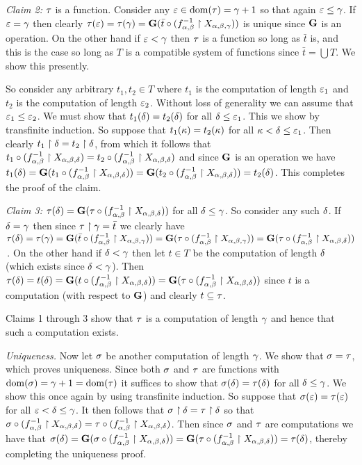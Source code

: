 {{    \emph{Claim 2:} $\tau$ is a function.
    Consider any $\varepsilon \in \mathrm{dom}(\tau) = \gamma+1$ so that again $\varepsilon \leq \gamma$.
    If $\varepsilon = \gamma$ then clearly $\tau(\varepsilon) = \tau(\gamma) = \mathbf{G}(\bar{t} \circ (f_{\alpha,\beta}^{-1} \restriction X_{\alpha,\beta,\gamma}))$ is unique since $\mathbf{G}$ is an operation.
    On the other hand if $\varepsilon < \gamma$ then $\tau$ is a function so long as $\bar{t}$ is, and this is the case so long as $T$ is a compatible system of functions since $\bar{t} = \bigcup T$.
    We show this presently.

    So consider any arbitrary $t_1, t_2 \in T$ where $t_1$ is the computation of length $\varepsilon_1$ and $t_2$ is the computation of length $\varepsilon_2$.
    Without loss of generality we can assume that $\varepsilon_1 \leq \varepsilon_2$.
    We must show that $t_1(\delta) = t_2(\delta)$ for all $\delta \leq \varepsilon_1$.
    This we show by transfinite induction.
    So suppose that $t_1(\kappa) = t_2(\kappa)$ for all $\kappa < \delta \leq \varepsilon_1$.
    Then clearly $t_1 \restriction \delta = t_2 \restriction \delta$, from which it follows that $t_1 \circ (f_{\alpha,\beta}^{-1} \restriction X_{\alpha,\beta,\delta}) = t_2 \circ (f_{\alpha,\beta}^{-1} \restriction X_{\alpha,\beta,\delta})$ and since $\mathbf{G}$ is an operation we have $t_1(\delta) = \mathbf{G}(t_1 \circ (f_{\alpha,\beta}^{-1} \restriction X_{\alpha,\beta,\delta})) = \mathbf{G}(t_2 \circ (f_{\alpha,\beta}^{-1} \restriction X_{\alpha,\beta,\delta})) = t_2(\delta)$.
    This completes the proof of the claim.

    \emph{Claim 3:} $\tau(\delta) = \mathbf{G}(\tau \circ (f_{\alpha,\beta}^{-1} \restriction X_{\alpha,\beta,\delta}))$ for all $\delta \leq \gamma$.
    So consider any such $\delta$.
    If $\delta = \gamma$ then since $\tau \restriction \gamma = \bar{t}$ we clearly have $\tau(\delta) = \tau(\gamma) = \mathbf{G}(\bar{t} \circ (f_{\alpha,\beta}^{-1} \restriction X_{\alpha,\beta,\gamma})) = \mathbf{G}(\tau \circ (f_{\alpha,\beta}^{-1} \restriction X_{\alpha,\beta,\gamma})) = \mathbf{G}(\tau \circ (f_{\alpha,\beta}^{-1} \restriction X_{\alpha,\beta,\delta}))$\,.
    On the other hand if $\delta < \gamma$ then let $t \in T$ be the computation of length $\delta$ (which exists since $\delta < \gamma$).
    Then $\tau(\delta) = t(\delta) = \mathbf{G}(t \circ (f_{\alpha,\beta}^{-1} \restriction X_{\alpha,\beta,\delta})) = \mathbf{G}(\tau \circ (f_{\alpha,\beta}^{-1} \restriction X_{\alpha,\beta,\delta}))$ since $t$ is a computation (with respect to $\mathbf{G}$) and clearly $t \subseteq \tau$.

    Claims 1 through 3 show that $\tau$ is a computation of length $\gamma$ and hence that such a computation exists.

    \emph{Uniqueness.} Now let $\sigma$ be another computation of length $\gamma$.
    We show that $\sigma = \tau$, which proves uniqueness.
    Since both $\sigma$ and $\tau$ are functions with $\mathrm{dom}(\sigma) = \gamma+1 = \mathrm{dom}(\tau)$ it suffices to show that $\sigma(\delta) = \tau(\delta)$ for all $\delta \leq \gamma$.
    We show this once again by using transfinite induction.
    So suppose that $\sigma(\varepsilon) = \tau(\varepsilon)$ for all $\varepsilon < \delta \leq \gamma$.
    It then follows that $\sigma \restriction \delta = \tau \restriction \delta$ so that $\sigma \circ (f_{\alpha,\beta}^{-1} \restriction X_{\alpha,\beta,\delta}) = \tau \circ (f_{\alpha,\beta}^{-1} \restriction X_{\alpha,\beta,\delta})$.
    Then since $\sigma$ and $\tau$ are computations we have that $\sigma(\delta) = \mathbf{G}(\sigma \circ (f_{\alpha,\beta}^{-1} \restriction X_{\alpha,\beta,\delta})) = \mathbf{G}(\tau \circ (f_{\alpha,\beta}^{-1} \restriction X_{\alpha,\beta,\delta})) = \tau(\delta)$, thereby completing the uniqueness proof.

}}
